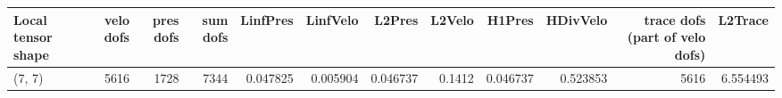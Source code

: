 \begin{tabular}{lrrrrrrrrrrr}
\toprule
Local tensor shape &  velo dofs &  pres dofs &  sum dofs &  LinfPres &  LinfVelo &   L2Pres &  L2Velo &   H1Pres &  HDivVelo &  trace dofs (part of velo dofs) &  L2Trace \\
\midrule
            (7, 7) &       5616 &       1728 &      7344 &  0.047825 &  0.005904 & 0.046737 &  0.1412 & 0.046737 &  0.523853 &                            5616 & 6.554493 \\
\bottomrule
\end{tabular}
